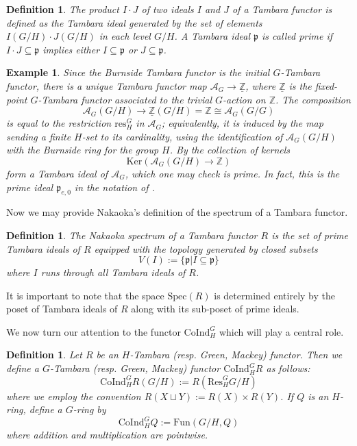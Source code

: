 \documentclass[11pt,dvipsnames]{amsart}
\newcommand{\Z}{\mathbb{Z}}
\newcommand{\A}{\mathcal{A}}
\newcommand{\p}{\mathfrak{p}}
\theoremstyle{BoldRemark}
\newtheorem{example}[theorem]{Example}
\newtheorem{definition}[theorem]{Definition}
\newcommand{\Res}{\mathrm{Res}}
\newcommand{\res}{\mathrm{res}}
\newcommand{\Coind}{\mathrm{CoInd}}
\renewcommand{\subset}{\subseteq}
\begin{document}
\begin{definition}
	The product $I \cdot J$ of two ideals $I$ and $J$ of a Tambara functor is defined as the Tambara ideal generated by the set of elements $I(G/H) \cdot J(G/H)$ in each level $G/H$. A Tambara ideal $\p$ is called prime if $I \cdot J \subset \p$ implies either $I \subset \p$ or $J \subset \p$.
\end{definition}

\begin{example}
    Since the Burnside Tambara functor is the initial $G$-Tambara functor, there is a unique Tambara functor map $\A_G \rightarrow \underline{\Z}$, where $\underline{\Z}$ is the fixed-point $G$-Tambara functor associated to the trivial $G$-action on $\Z$. The composition 
    \[ 
        \A_G(G/H) \rightarrow \underline{\Z}(G/H) = \Z \cong \A_G(G/G) 
    \] 
    is equal to the restriction $\res_H^G$ in $\A_G$; equivalently, it is induced by the map sending a finite $H$-set to its cardinality, using the identification of $\A_G(G/H)$ with the Burnside ring for the group $H$. By \cite[Proposition 2.10]{Nak11a} the collection of kernels 
    \[ 
        \mathrm{Ker}(\A_G(G/H) \rightarrow \Z) 
    \] 
    form a Tambara ideal of $\A_G$, which one may check is prime. In fact, this is the prime ideal $\p_{e,0}$ in the notation of \cite{4DSC}.
\end{example}

Now we may provide Nakaoka's definition of the spectrum of a Tambara functor.

\begin{definition}\cite[Section 4.2]{Nak11a}
    The \emph{Nakaoka spectrum} of a Tambara functor $R$ is the set of prime Tambara ideals of $R$ equipped with the topology generated by closed subsets
    \[ 
        V(I) := \{ \p | I \subset \p \} 
    \] 
    where $I$ runs through all Tambara ideals of $R$.
\end{definition}

It is important to note that the space $\mathrm{Spec}(R)$ is determined entirely by the poset of Tambara ideals of $R$ along with its sub-poset of prime ideals.

We now turn our attention to the functor $\Coind_H^G$ which will play a central role.

\begin{definition}
    Let $R$ be an $H$-Tambara (resp. Green, Mackey) functor. Then we define a $G$-Tambara (resp. Green, Mackey) functor $\Coind_H^G R$ as follows:
    \[ 
        \Coind_H^G R(G/H) := R(\Res_H^G G/H) 
    \] 
    where we employ the convention $R(X \sqcup Y) := R(X) \times R(Y)$. If $Q$ is an $H$-ring, define a $G$-ring by
    \[ 
        \Coind_H^G Q := \mathrm{Fun}(G/H,Q) 
    \] 
    where addition and multiplication are pointwise.
\end{definition}
\end{document}
